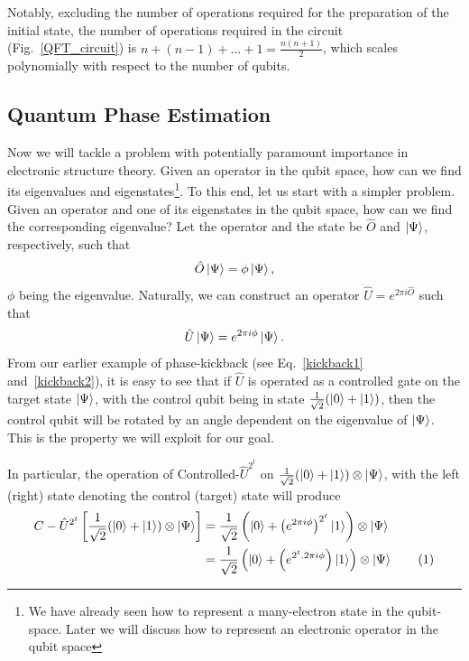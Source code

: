 \documentclass[12pt,oneside]{book}
\newcommand\numberthis{\addtocounter{equation}{1}\tag{\theequation}}
\begin{document}
Notably, excluding the number of operations required for the preparation of the initial state, the number of operations required in the circuit (Fig.~\ref{QFT_circuit}) is $n + (n-1) + \hdots + 1=\frac{n(n+1)}{2}$, which scales polynomially with respect to the number of qubits.

\subsection*{Quantum Phase Estimation}

Now we will tackle a problem with potentially paramount importance in electronic structure theory. Given an operator in the qubit space, how can we find its eigenvalues and eigenstates\footnote{We have already seen how to represent a many-electron state in the qubit-space. Later we will discuss how to represent an electronic operator in the qubit space}.
%
To this end, let us start with a simpler problem.
%
Given an operator and one of its eigenstates in the qubit space, how can we find the corresponding eigenvalue?
%
Let the operator and the state be $\hat{O}$ and $\ket{\Psi}$, respectively, such that 
\begin{align}
    \hat{O}\ket{\Psi}=\phi\ket{\Psi},
\end{align}
$\phi$ being the eigenvalue. Naturally, we can construct an operator $\hat{U}=e^{2\pi i \hat{O}}$ such that
\begin{align}
    \hat{U}\ket{\Psi}=e^{2\pi i \phi}\ket{\Psi}.
\end{align}
From our earlier example of phase-kickback (see Eq.~\ref{kickback1} and~\ref{kickback2}), it is easy to see that if $\hat{U}$ is operated as a controlled gate on the target state $\ket{\Psi}$, with the control qubit being in state $\frac{1}{\sqrt{2}}(\ket{0}+\ket{1})$, then the control qubit will be rotated by an angle dependent on the eigenvalue of $\ket{\Psi}$. This is the property we will exploit for our goal.

In particular, the operation of Controlled-$\hat{U}^{2^t}$ on $\frac{1}{\sqrt{2}}(\ket{0}+\ket{1}) \otimes \ket{\Psi}$, with the left (right) state denoting the control (target) state will produce
\begin{align*}\label{representativeCROT}
    C-\hat{U}^{2^t} \left[\frac{1}{\sqrt{2}}(\ket{0}+\ket{1}) \otimes \ket{\Psi}\right] &{} = \frac{1}{\sqrt{2}}\left(\ket{0}+\left(e^{2\pi i \phi}\right)^{2^t}\ket{1}\right) \otimes \ket{\Psi}\\
    &{} = \frac{1}{\sqrt{2}}\left(\ket{0}+\left(e^{2^t . 2\pi i \phi}\right)\ket{1}\right) \otimes \ket{\Psi}\numberthis
\end{align*}
\end{document}
